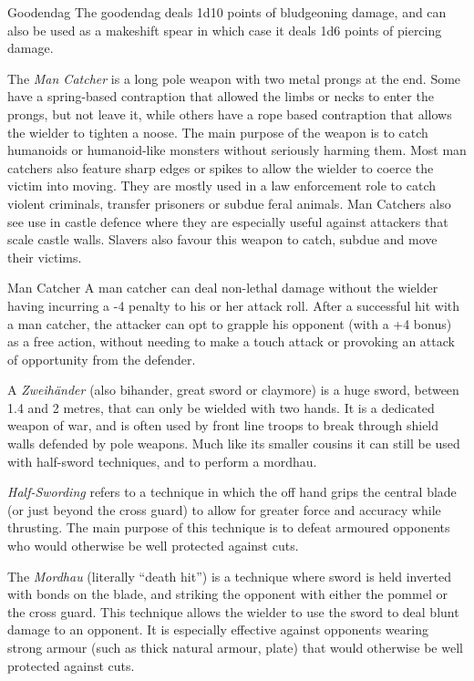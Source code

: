 \begin{35e}{Goodendag}
  The goodendag deals 1d10 points of bludgeoning damage, and can also be used
  as a makeshift spear in which case it deals 1d6 points of piercing damage.
\end{35e}

The \emph{Man Catcher} is a long pole weapon with two metal prongs at the end.
Some have a spring-based contraption that allowed the limbs or necks to enter
the prongs, but not leave it, while others have a rope based contraption that
allows the wielder to tighten a noose. The main purpose of the weapon is to
catch humanoids or humanoid-like monsters without seriously harming them. Most
man catchers also feature sharp edges or spikes to allow the wielder to coerce
the victim into moving. They are mostly used in a law enforcement role to
catch violent criminals, transfer prisoners or subdue feral animals. Man
Catchers also see use in castle defence where they are especially useful
against attackers that scale castle walls. Slavers also favour this weapon to
catch, subdue and move their victims.

\begin{35e}{Man Catcher}
  A man catcher can deal non-lethal damage without the wielder having
  incurring a -4 penalty to his or her attack roll. After a successful hit
  with a man catcher, the attacker can opt to grapple his opponent (with a +4
  bonus) as a free action, without needing to make a touch attack or provoking
  an attack of opportunity from the defender.
\end{35e}

A \emph{Zweihänder} (also bihander, great sword or claymore) is a huge sword,
between 1.4 and 2 metres, that can only be wielded with two hands. It is a
dedicated weapon of war, and is often used by front line troops to break
through shield walls defended by pole weapons. Much like its smaller cousins
it can still be used with half-sword techniques, and to perform a mordhau.

\emph{Half-Swording} refers to a technique in which the off hand grips the
central blade (or just beyond the cross guard) to allow for greater force and
accuracy while thrusting. The main purpose of this technique is to defeat
armoured opponents who would otherwise be well protected against cuts.

The \emph{Mordhau} (literally ``death hit'') is a technique where sword is
held inverted with bonds on the blade, and striking the opponent with either
the pommel or the cross guard. This technique allows the wielder to use the
sword to deal blunt damage to an opponent. It is especially effective against
opponents wearing strong armour (such as thick natural armour, plate) that
would otherwise be well protected against cuts.

